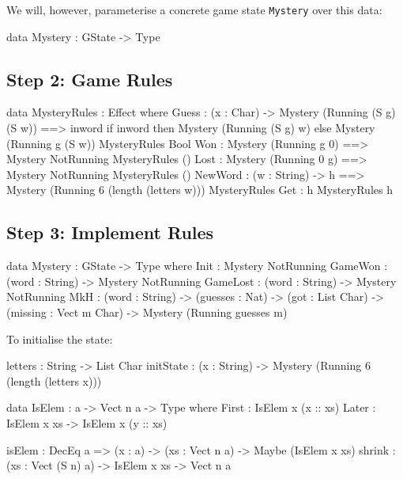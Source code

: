 We will, however, parameterise a concrete game state \texttt{Mystery} over
this data:

\begin{code}
data Mystery : GState -> Type
\end{code}

\subsection{Step 2: Game Rules}

\begin{code}
data MysteryRules : Effect where
     Guess : (x : Char) ->
             { Mystery (Running (S g) (S w)) ==>
               {inword} if inword then Mystery (Running (S g) w)
                                  else Mystery (Running g (S w)) }
                MysteryRules Bool
     Won  : { Mystery (Running g 0) ==> Mystery NotRunning } MysteryRules ()
     Lost : { Mystery (Running 0 g) ==> Mystery NotRunning } MysteryRules ()
     NewWord : (w : String) ->
               { h ==> Mystery (Running 6 (length (letters w))) } MysteryRules
     Get  : { h } MysteryRules h
\end{code}


\subsection{Step 3: Implement Rules}

\begin{code}
data Mystery : GState -> Type where
     Init     : Mystery NotRunning 
     GameWon  : (word : String) -> Mystery NotRunning
     GameLost : (word : String) -> Mystery NotRunning
     MkH      : (word : String) ->
                (guesses : Nat) ->
                (got : List Char) ->
                (missing : Vect m Char) ->
                Mystery (Running guesses m)
\end{code}

\noindent
To initialise the state:

\begin{code}
letters : String -> List Char
initState : (x : String) -> Mystery (Running 6 (length (letters x)))
\end{code}

\begin{code}
data IsElem : a -> Vect n a -> Type where
     First : IsElem x (x :: xs)
     Later : IsElem x xs -> IsElem x (y :: xs)

isElem : DecEq a => (x : a) -> (xs : Vect n a) -> Maybe (IsElem x xs)
shrink : (xs : Vect (S n) a) -> IsElem x xs -> Vect n a
\end{code}

